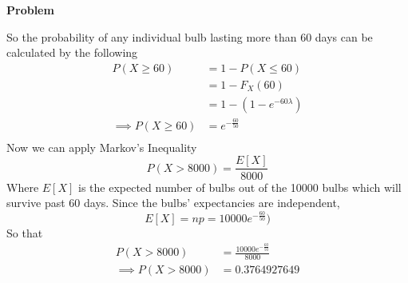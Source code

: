 \documentclass[12pt]{article}
\newenvironment{Ex}{\textbf{Problem}\vspace{.75em}\\}{}
\begin{document}
\begin{enumerate}
\begin{Ex}
\begin{solution}
\begin{equation}
      \end{equation}
      So the probability of any individual bulb lasting more than 60
      days can be calculated by the following
      \begin{equation}
        \label{eq:7-p-60}
        \begin{aligned}
          P(X \ge 60) &= 1 - P(X \le 60) \\
          &= 1 - F_X(60) \\
          &= 1 - (1 - e^{-60\lambda}) \\
          \implies P(X \ge 60) &= e^{-\frac{60}{50}} \\
        \end{aligned}
      \end{equation}
      Now we can apply Markov's Inequality
      \begin{equation}
        \label{eq:7-markov-presol}
        P(X>8000) = \frac{E[X]}{8000}
      \end{equation}
      Where $E[X]$ is the expected number of bulbs out of the 10000
      bulbs which will survive past 60 days. Since the bulbs'
      expectancies are independent,
      \begin{equation}
        \label{eq:7-markov-e}
        E[X] = np = 10000 e^{-\frac{60}{50}})
      \end{equation}
      So that
      \begin{equation}
        \label{eq:7-markov-sol}
        \begin{aligned}
          P(X>8000) &= \frac{10000 e^{-\frac{60}{50}}}{8000} \\
          \implies P(X>8000) &= 0.3764927649 \\
        \end{aligned}
      \end{equation}
    \end{solution}
  \end{Ex}

\end{enumerate}
\end{document}
